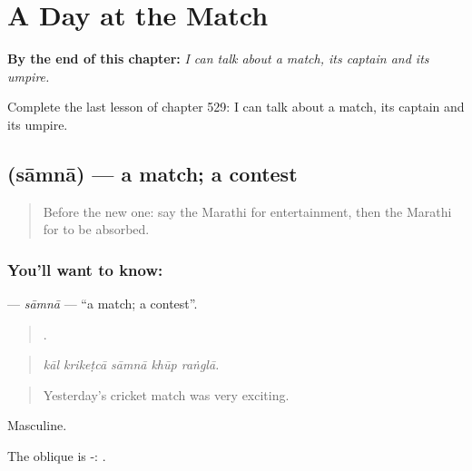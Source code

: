 
\chapter{A Day at the Match}
\label{ch:mr-a-day-at-the-match}

\begin{chapteropening}
\textbf{By the end of this chapter:} \emph{I can talk about a match, its captain and its umpire.}

Complete the last lesson of chapter 529: I can talk about a match, its captain and its umpire.
\end{chapteropening}

\section[\texorpdfstring{\mr{सामना} (sāmnā)}{सामना (sāmnā)}]{ (sāmnā) — a match; a contest}

\label{lesson:MR-C529-samna}



\begin{quote}
Before the new one: say the Marathi for entertainment, then the Marathi for to be absorbed.
\end{quote}

\subsection*{You'll want to know: }
\textbf{} — \emph{sāmnā} — \textquotedblleft{}a match; a contest\textquotedblright{}.

\begin{quote}
    .
\end{quote}

\begin{quote}
\emph{kāl krikeṭcā sāmnā khūp raṅglā.}
\end{quote}

\begin{quote}
Yesterday's cricket match was very exciting.
\end{quote}

Masculine.

The oblique is -: .

